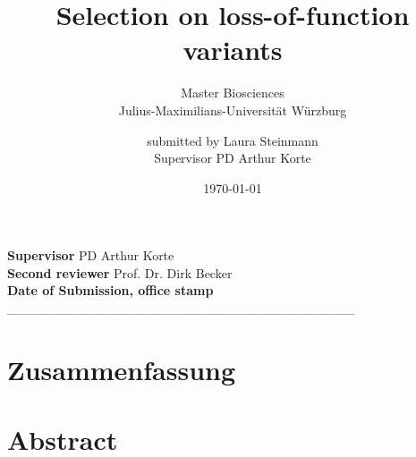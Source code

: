 \documentclass[english,onecolumn,bibliography=totocnumbered]{scrreprt}
\begin{document}
\titlehead{\centering\texttt{[image: CCTB\_Logo.pdf]}}
\title{Selection on loss-of-function variants}
\subject{Master Thesis}
\subtitle{\vspace{1cm}Master Biosciences \\ Julius-Maximilians-Universität Würzburg}
\author{submitted by Laura Steinmann \\Supervisor PD Arthur Korte}

\date{\today}


\maketitle
\thispagestyle{empty}
\newpage
\vspace*{\fill}
\begingroup
\centering
\textsf{\textbf{Supervisor} \quad PD Arthur Korte}\\
\vspace{2cm}
\textsf{\textbf{Second reviewer} \quad Prof. Dr. Dirk Becker} \\
\vspace{2cm}
\textsf{\textbf{Date of Submission, office stamp}}\\
\vspace{10mm}
\_\_\_\_\_\_\_\_\_\_\_\_\_\_\_\_\_\_\_\_\_\_\_\_\_\_\_\_\_\_\_\_\_\_\_\_\_\\
\endgroup
\vspace*{{\fill}}
\setcounter{page}{1}
\chapter*{Zusammenfassung}
\chapter*{Abstract}
\newpage
\tableofcontents
{}

\newpage

\newpage

\newpage

\newpage
\appendix
\addtocounter{chapter}{1}
\listoffigures

\printbibliography
\newpage
\end{document}
